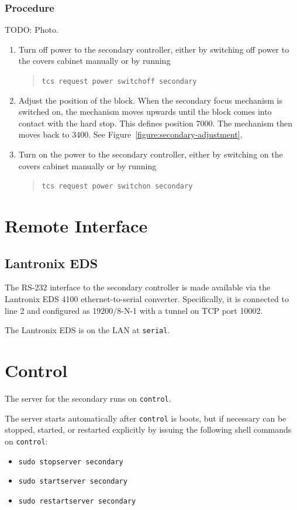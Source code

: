 \subsubsection{Procedure}

TODO: Photo.

\begin{enumerate}
\item Turn off power to the secondary controller, either by switching off power to the covers cabinet manually or by running
\begin{quote}
\verb|tcs request power switchoff secondary|
\end{quote}
\item Adjust the position of the block. When the secondary focus mechanism is switched on, the mechanism moves upwards until the block comes into contact with the hard stop. This defines position 7000. The mechanism then moves back to 3400. See Figure~\ref{figure:secondary-adjustment}.
\item Turn on the power to the secondary controller, either by switching on the covers cabinet manually or by running 
\begin{quote}
\verb|tcs request power switchon secondary|
\end{quote}
\end{enumerate}

\section{Remote Interface}

\subsection{Lantronix EDS}
\label{section:secondary-lantronix-eds}

The RS-232 interface to the secondary controller is made available via the Lantronix EDS 4100 ethernet-to-serial converter. Specifically, it is connected to line 2 and configured as 19200/8-N-1 with a tunnel on TCP port 10002.

The Lantronix EDS is on the LAN at \verb|serial|.

\section{Control}

The server for the secondary runs on \verb|control|. 

The server starts automatically after \verb|control| is boots, but if necessary can be stopped, started, or restarted explicitly by issuing the following shell commands on \verb|control|:
\begin{itemize}
\item
\verb|sudo stopserver secondary|
\item
\verb|sudo startserver secondary|
\item
\verb|sudo restartserver secondary|
\end{itemize}

